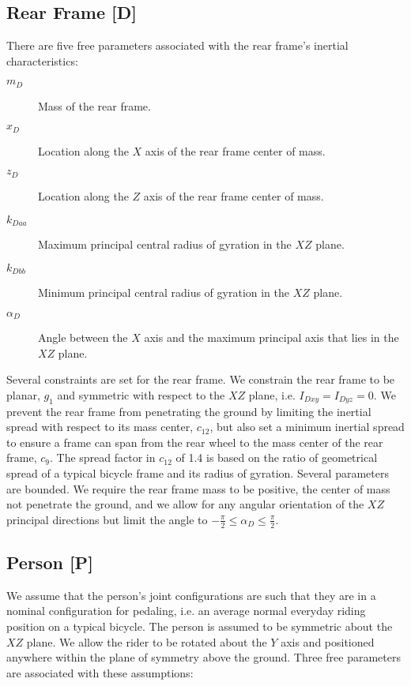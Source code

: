 \documentclass{bmd2019a}
\begin{document}
\subsection*{Rear Frame [D]}

There are five free parameters associated with the rear frame's inertial
characteristics:

\begin{description}
  \item[$m_D$] Mass of the rear frame.
  \item[$x_D$] Location along the $X$ axis of the rear frame center of mass.
  \item[$z_D$] Location along the $Z$ axis of the rear frame center of mass.
  \item[$k_{Daa}$] Maximum principal central radius of gyration in the $XZ$
    plane.
  \item[$k_{Dbb}$] Minimum principal central radius of gyration in the $XZ$
    plane.
  \item[$\alpha_D$] Angle between the $X$ axis and the maximum principal axis
    that lies in the $XZ$ plane.
\end{description}

Several constraints are set for the rear frame. We constrain the rear frame to
be planar, $g_1$ and symmetric with respect to the $XZ$ plane, i.e. $I_{Dxy} =
I_{Dyz} = 0$. We prevent the rear frame from penetrating the ground by limiting
the inertial spread with respect to its mass center, $c_{12}$, but also set a
minimum inertial spread to ensure a frame can span from the rear wheel to the
mass center of the rear frame, $c_9$. The spread factor in $c_{12}$ of 1.4 is
based on the ratio of geometrical spread of a typical bicycle frame and its
radius of gyration. Several parameters are bounded. We require the rear frame
mass to be positive, the center of mass not penetrate the ground, and we allow
for any angular orientation of the $XZ$ principal directions but limit the
angle to $-\frac{\pi}{2} \leq \alpha_D \leq \frac{\pi}{2}$.

\subsection{Person [P]}

We assume that the person's joint configurations are such that they are in a
nominal configuration for pedaling, i.e. an average normal everyday riding
position on a typical bicycle. The person is assumed to be symmetric about the
$XZ$ plane. We allow the rider to be rotated about the $Y$ axis and positioned
anywhere within the plane of symmetry above the ground. Three free parameters
are associated with these assumptions:
\end{document}
